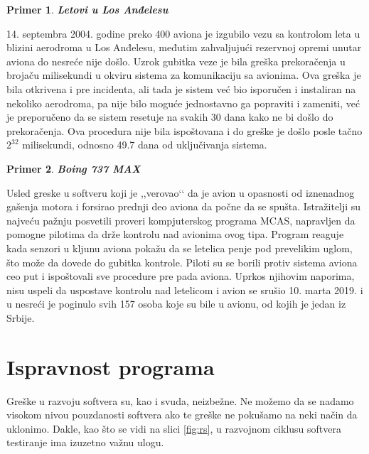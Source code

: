 \documentclass[a4paper]{article}
\newtheorem{primer}{Primer}[section]
\begin{document}
\begin{primer}
\textbf{Letovi u Los Anđelesu}
\end{primer}
14. septembra 2004. godine preko 400 aviona je izgubilo vezu sa kontrolom leta u blizini aerodroma u Los Anđelesu, međutim zahvaljujući rezervnoj opremi unutar aviona do nesreće nije došlo. Uzrok gubitka veze je bila greška prekoračenja u brojaču milisekundi u okviru sistema za komunikaciju sa avionima. Ova greška je bila otkrivena i pre incidenta, ali tada je sistem već bio isporučen i instaliran na nekoliko aerodroma, pa nije bilo moguće jednostavno ga popraviti i zameniti, već je preporučeno da se sistem resetuje na svakih 30 dana kako ne bi došlo do prekoračenja. Ova procedura nije bila ispoštovana i do greške je došlo posle tačno $2^{32}$ milisekundi, odnosno 49.7 dana od uključivanja sistema.\\

\begin{primer}
\textbf{Boing 737 MAX}
\end{primer}
Usled greske u softveru koji je ,,verovao‘‘ da je avion u opasnosti od iznenadnog gašenja motora i forsirao prednji deo aviona da počne da se spušta. Istražitelji su najveću pažnju posvetili proveri kompjuterskog programa MCAS, napravljen da pomogne pilotima da drže kontrolu nad avionima ovog tipa. Program reaguje kada senzori u kljunu aviona pokažu da se letelica penje pod prevelikim uglom, što može da dovede do gubitka kontrole. Piloti su se borili protiv sistema aviona ceo put i ispoštovali sve procedure pre pada aviona. Uprkos njihovim naporima, nisu uspeli da uspostave kontrolu nad letelicom i avion se srušio 10. marta 2019. i u nesreći je poginulo svih 157 osoba koje su bile u avionu, od kojih je jedan iz Srbije.\\


\section{Ispravnost programa}
\label{sec:ispravnost}
Greške u razvoju softvera su, kao i svuda, neizbežne.
Ne možemo da se nadamo visokom nivou pouzdanosti softvera ako te greške ne pokušamo na neki način da uklonimo.
Dakle, kao što se vidi na slici \ref{fig:rs}, u razvojnom ciklusu softvera testiranje ima izuzetno važnu ulogu.
\end{document}
